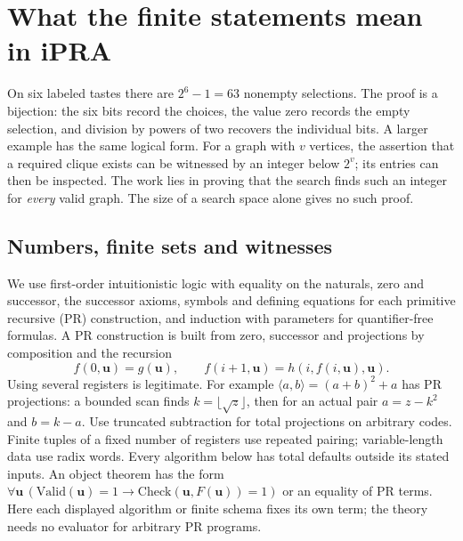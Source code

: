 \section{What the finite statements mean in iPRA}
\label{sec:found}
On six labeled tastes there are $2^6-1=63$ nonempty selections. The proof is a bijection: the six bits record the choices, the value zero records the empty selection, and division by powers of two recovers the individual bits. A larger example has the same logical form. For a graph with $v$ vertices, the assertion that a required clique exists can be witnessed by an integer below $2^v$; its entries can then be inspected. The work lies in proving that the search finds such an integer for \emph{every} valid graph. The size of a search space alone gives no such proof.

\subsection{Numbers, finite sets and witnesses}
We use first-order intuitionistic logic with equality on the naturals, zero and successor, the successor axioms, symbols and defining equations for each primitive recursive (PR) construction, and induction with parameters for quantifier-free formulas. A PR construction is built from zero, successor and projections by composition and the recursion
\[
 f(0,\mathbf u)=g(\mathbf u),\qquad f(i+1,\mathbf u)=h(i,f(i,\mathbf u),\mathbf u).
\]
Using several registers is legitimate. For example $\langle a,b\rangle=(a+b)^2+a$ has PR projections: a bounded scan finds $k=\lfloor\sqrt z\rfloor$, then for an actual pair $a=z-k^2$ and $b=k-a$. Use truncated subtraction for total projections on arbitrary codes. Finite tuples of a fixed number of registers use repeated pairing; variable-length data use radix words. Every algorithm below has total defaults outside its stated inputs. An object theorem has the form $\forall\mathbf u\,(\mathrm{Valid}(\mathbf u)=1\to \mathrm{Check}(\mathbf u,F(\mathbf u))=1)$ or an equality of PR terms. Here each displayed algorithm or finite schema fixes its own term; the theory needs no evaluator for arbitrary PR programs.


